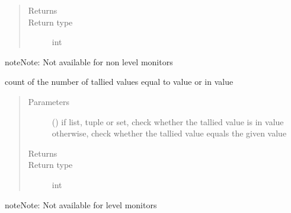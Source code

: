 \documentclass[letterpaper,10pt,english]{sphinxmanual}
\begin{document}
\begin{fulllineitems}
\begin{fulllineitems}
\begin{quote}
\begin{description}
\item[{Returns}] \leavevmode
{}

\item[{Return type}] \leavevmode
int

\end{description}\end{quote}

\begin{sphinxadmonition}{note}{Note:}
Not available for non level monitors
\end{sphinxadmonition}

\end{fulllineitems}


\begin{fulllineitems}
\label{\detokenize{Reference:salabim.Monitor.value_number_of_entries}}
count of the number of tallied values equal to value or in value
\begin{quote}\begin{description}
\item[{Parameters}] \leavevmode
{} () \textendash{} if list, tuple or set, check whether the tallied value is in value 
otherwise, check whether the tallied value equals the given value

\item[{Returns}] \leavevmode
{}

\item[{Return type}] \leavevmode
int

\end{description}\end{quote}

\begin{sphinxadmonition}{note}{Note:}
Not available for level monitors
\end{sphinxadmonition}

\end{fulllineitems}



\end{fulllineitems}
\end{document}
